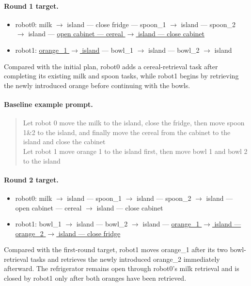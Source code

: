 \paragraph{Round 1 target.}
\begin{itemize}
    \item robot0: milk $\rightarrow$ island --- close fridge --- spoon\_1 $\rightarrow$ island --- spoon\_2 $\rightarrow$ island --- \underline{open cabinet --- cereal $\rightarrow$ island --- close cabinet}
    \item robot1: \underline{orange\_1 $\rightarrow$ island} --- bowl\_1 $\rightarrow$ island --- bowl\_2 $\rightarrow$ island
\end{itemize}
Compared with the initial plan, robot0 adds a cereal-retrieval task after completing its existing milk and spoon tasks, while robot1 begins by retrieving the newly introduced orange before continuing with the bowls.
\paragraph{Baseline example prompt.}
\begin{quote}\small\ttfamily
Let robot 0 move the milk to the island, close the fridge, then move spoon 1\&2 to the island, and finally move the cereal from the cabinet to the island and close the cabinet\\
Let robot 1 move orange 1 to the island first, then move bowl 1 and bowl 2 to the island
\end{quote}

\paragraph{Round 2 target.}
\begin{itemize}
    \item robot0: milk $\rightarrow$ island --- spoon\_1 $\rightarrow$ island --- spoon\_2 $\rightarrow$ island --- open cabinet --- cereal $\rightarrow$ island --- close cabinet
    \item robot1: bowl\_1 $\rightarrow$ island --- bowl\_2 $\rightarrow$ island --- \underline{orange\_1 $\rightarrow$ island --- orange\_2 $\rightarrow$ island --- close fridge}
\end{itemize}
Compared with the first-round target, robot1 moves orange\_1 after its two bowl-retrieval tasks and retrieves the newly introduced orange\_2 immediately afterward.
The refrigerator remains open through robot0's milk retrieval and is closed by robot1 only after both oranges have been retrieved.
